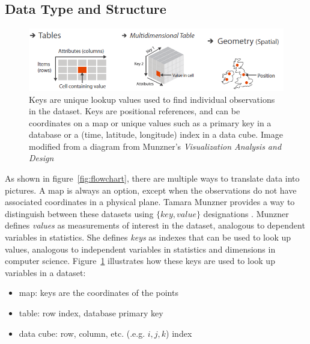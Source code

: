\documentclass[../main.tex]{subfiles}
\begin{document}
\subsection{Data Type and Structure}
\label{sec:intro_data_structure}
\begin{figure}[h!]
 \includegraphics[width=\textwidth]{figures/intro/munzner_datatypes}
\caption{Keys are unique lookup values used to find individual observations in the dataset. Keys are positional references, and can be coordinates on a map or unique values such as a primary key in a database or a (time, latitude, longitude) index in a data cube. Image modified from a diagram from Munzner's \textit{Visualization Analysis and Design} \cite{munznerVisualizationAnalysisDesign2014}}
\label{fig:munzner_datatypes}
\end{figure}

As shown in figure~\ref{fig:flowchart}, there are multiple ways to translate data into pictures. A map is always an option, except when the observations do not have associated coordinates in a physical plane. Tamara Munzner provides a way to distinguish between these datasets using $\{key, value\}$ designations \cite{munznerVisualizationAnalysisDesign2014}. Munzner defines \textit{values} as measurements of interest in the dataset, analogous to dependent variables in statistics. She defines \textit{keys} as indexes that can be used to look up values, analogous to independent variables in statistics and dimensions in computer science. Figure~\ref{fig:munzner_datatypes} illustrates how these keys are used to look up variables in a dataset: 
\begin{itemize}
	\item map: keys are the coordinates of the points
	\item table: row index, database primary key
	\item data cube: row, column, etc. (.e.g. $i,j,k$) index
\end{itemize}
\end{document}
